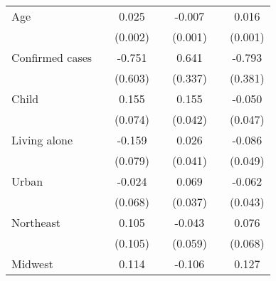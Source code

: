 {\begin{tabular}{l*{6}{c}}
Age                 &                     &       0.025\sym{***}&                     &      -0.007\sym{***}&                     &       0.016\sym{***}\\
                    &                     &     (0.002)         &                     &     (0.001)         &                     &     (0.001)         \\
\addlinespace
Confirmed cases     &                     &      -0.751         &                     &       0.641\sym{*}  &                     &      -0.793\sym{**} \\
                    &                     &     (0.603)         &                     &     (0.337)         &                     &     (0.381)         \\
\addlinespace
Child               &                     &       0.155\sym{**} &                     &       0.155\sym{***}&                     &      -0.050         \\
                    &                     &     (0.074)         &                     &     (0.042)         &                     &     (0.047)         \\
\addlinespace
Living alone        &                     &      -0.159\sym{**} &                     &       0.026         &                     &      -0.086\sym{*}  \\
                    &                     &     (0.079)         &                     &     (0.041)         &                     &     (0.049)         \\
\addlinespace
Urban               &                     &      -0.024         &                     &       0.069\sym{*}  &                     &      -0.062         \\
                    &                     &     (0.068)         &                     &     (0.037)         &                     &     (0.043)         \\
\addlinespace
Northeast           &                     &       0.105         &                     &      -0.043         &                     &       0.076         \\
                    &                     &     (0.105)         &                     &     (0.059)         &                     &     (0.068)         \\
\addlinespace
Midwest             &                     &       0.114         &                     &      -0.106\sym{**} &                     &       0.127\sym{**} \\

\end{tabular}}
